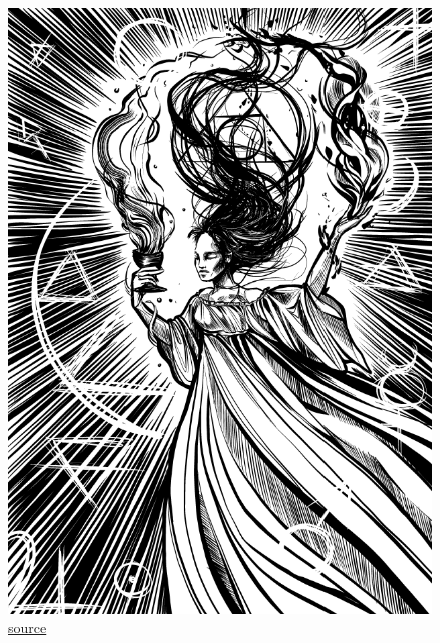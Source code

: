 \documentclass[12pt,a4paper,twoside,openany]{book}
\begin{document}



\begin{figure}[h!]
  \centering
  \caption{\href{https://petrakubaskova.cz/wp-content/uploads/2024/07/elixir-cze.png}{source}}
  \includegraphics[width=\textwidth]{carodejka}
\end{figure}




\end{document}
